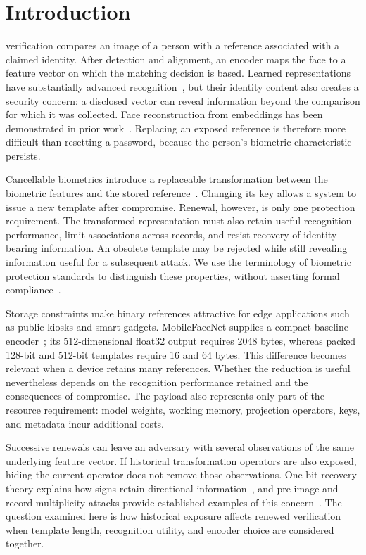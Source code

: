 \section{Introduction}\label{sec:introduction}
 verification compares an image of a person with a reference associated with a claimed identity. After detection and alignment, an encoder maps the face to a feature vector on which the matching decision is based. Learned representations have substantially advanced recognition~\cite{deepface,facenet,arcface}, but their identity content also creates a security concern: a disclosed vector can reveal information beyond the comparison for which it was collected. Face reconstruction from embeddings has been demonstrated in prior work~\cite{mai2019reconstruction,vec2face,shahreza2024adapter}. Replacing an exposed reference is therefore more difficult than resetting a password, because the person's biometric characteristic persists.

Cancellable biometrics introduce a replaceable transformation between the biometric features and the stored reference~\cite{ratha2001enhancing,ratha2007cancelable}. Changing its key allows a system to issue a new template after compromise. Renewal, however, is only one protection requirement. The transformed representation must also retain useful recognition performance, limit associations across records, and resist recovery of identity-bearing information. An obsolete template may be rejected while still revealing information useful for a subsequent attack. We use the terminology of biometric protection standards to distinguish these properties, without asserting formal compliance~\cite{iso24745,iso30136}.

Storage constraints make binary references attractive for edge applications such as public kiosks and smart gadgets. MobileFaceNet supplies a compact baseline encoder~\cite{chen2018mobilefacenet}; its 512-dimensional float32 output requires 2048 bytes, whereas packed 128-bit and 512-bit templates require 16 and 64 bytes. This difference becomes relevant when a device retains many references. Whether the reduction is useful nevertheless depends on the recognition performance retained and the consequences of compromise. The payload also represents only part of the resource requirement: model weights, working memory, projection operators, keys, and metadata incur additional costs.

Successive renewals can leave an adversary with several observations of the same underlying feature vector. If historical transformation operators are also exposed, hiding the current operator does not remove those observations. One-bit recovery theory explains how signs retain directional information~\cite{plan2013,jacques2013}, and pre-image and record-multiplicity attacks provide established examples of this concern~\cite{wang2021csa,li2014multiplicity}. The question examined here is how historical exposure affects renewed verification when template length, recognition utility, and encoder choice are considered together.

